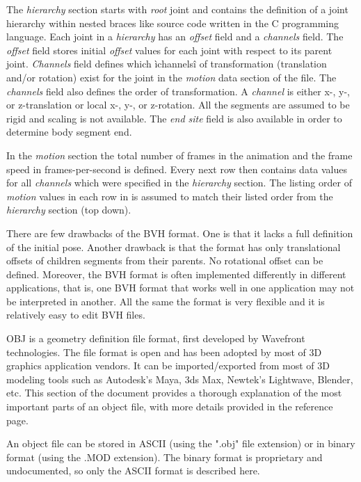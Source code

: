 \documentclass[times, 10pt,twocolumn]{article}
\begin{document}
The \emph{hierarchy} section starts with \emph{root} joint and contains the definition of a joint hierarchy within nested braces like source code written in the C programming language.
Each joint in a \emph{hierarchy} has an \emph{offset} field and a \emph{channels} field.
The \emph{offset} field stores initial \emph{offset} values for each joint with respect to its parent joint.
\emph{Channels} field defines which ìchannelsî of transformation (translation and/or rotation) exist for the joint in
the \emph{motion} data section of the file. The \emph{channels} field also defines the order of transformation. A
\emph{channel} is either x-, y-, or z-translation or local x-, y-, or z-rotation. All the segments are assumed
to be rigid and scaling is not available.
The \emph{end site} field is also available in order to determine body segment end.

In the \emph{motion} section the total number of frames in the animation and the frame
speed in frames-per-second is defined. Every next row then contains data values for all \emph{channels} which were specified in the \emph{hierarchy} section.
The listing order of \emph{motion} values in each row in is assumed to match their listed order from the \emph{hierarchy} section (top down).

There are few drawbacks of the BVH format. One is that it lacks a full definition of the initial pose. Another
drawback is that the format has only translational offsets of children segments from their parents. No
rotational offset can be defined. Moreover, the BVH format is often implemented differently in different
applications, that is, one BVH format that works well in one application may not be interpreted
in another. All the same the format is very flexible and it is relatively easy to edit BVH files.


OBJ is a geometry definition file format, first developed by Wavefront technologies. The file format is open and has been adopted by most of 3D graphics application vendors. It can be imported/exported from most of 3D modeling tools such as Autodesk's Maya, 3ds Max, Newtek's Lightwave, Blender, etc.  This section of the document provides a  thorough explanation of the most important parts of an object file, with more details provided in the reference page.

An object file can be stored in ASCII (using the ".obj" file extension) or in binary format (using the .MOD extension). The binary format is proprietary and undocumented, so only the ASCII format is described here.
\end{document}
